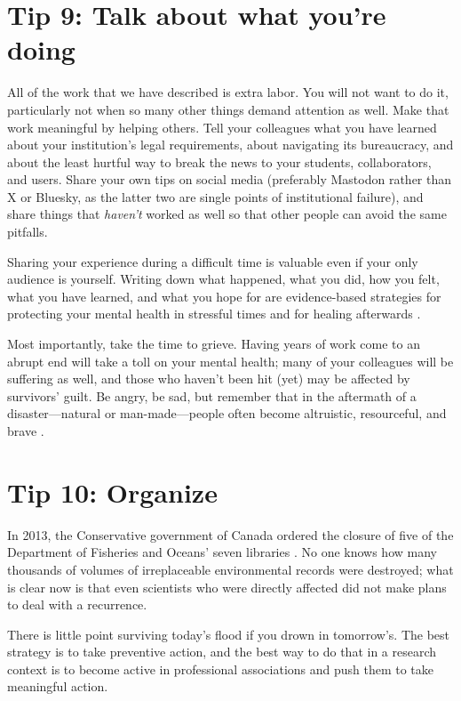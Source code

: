 \documentclass[10pt,letterpaper]{article}
\begin{document}
\section*{Tip 9: Talk about what you're doing}

All of the work that we have described is extra labor.
You will not want to do it,
particularly not when so many other things demand attention as well.
Make that work meaningful by helping others.
Tell your colleagues what you have learned about your institution's legal requirements,
about navigating its bureaucracy,
and about the least hurtful way to break the news to your students, collaborators, and users.
Share your own tips on social media
(preferably Mastodon rather than X or Bluesky,
as the latter two are single points of institutional failure),
and share things that \emph{haven't} worked as well
so that other people can avoid the same pitfalls.

Sharing your experience during a difficult time is valuable even if your only audience is yourself.
Writing down what happened, what you did, how you felt, what you have learned, and what you hope for
are evidence-based strategies for protecting your mental health in stressful times
and for healing afterwards \cite{Pennebaker2016,Cullen2022}.

Most importantly,
take the time to grieve.
Having years of work come to an abrupt end will take a toll on your mental health;
many of your colleagues will be suffering as well,
and those who haven't been hit (yet) may be affected by survivors' guilt.
Be angry,
be sad,
but remember that in the aftermath of a disaster---natural or man-made---people
often become altruistic, resourceful, and brave \cite{Yang2024}.

\section*{Tip 10: Organize}

In 2013,
the Conservative government of Canada ordered the closure of
five of the Department of Fisheries and Oceans' seven libraries \cite{Nikiforuk2013}.
No one knows how many thousands of volumes of irreplaceable environmental records were destroyed;
what is clear now is that even scientists who were directly affected
did not make plans to deal with a recurrence.

There is little point surviving today's flood if you drown in tomorrow's.
The best strategy is to take preventive action,
and the best way to do that in a research context
is to become active in professional associations
and push them to take meaningful action.
\end{document}
